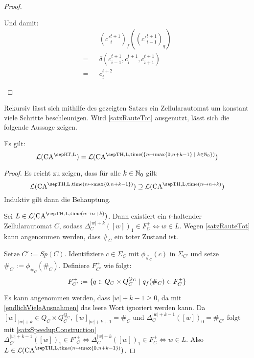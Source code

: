 \begin{proof}
\begin{enumerate}
            Und damit:
            \begin{align*}
                  && (c'^{t+1}_i)_f((c'^{t+1}_{i-1})_q) \\
                = && \delta(c^{t+1}_{i-1}, c^{t+1}_{i}, c^{t+1}_{i+1}) \\
                = && c^{t+2}_i
            \end{align*}
            
            
    \end{enumerate}
\end{proof}

Rekursiv lässt sich mithilfe des gezeigten Satzes ein Zellularautomat um konstant viele Schritte beschleunigen.
Wird \cref{satzRauteTot} ausgenutzt, lässt sich die folgende Aussage zeigen.

\begin{satz}
    \label{satzEchtzeitSpeedup}
    Es gilt:
    \[
        \CAL{\CART, \CALeft} =
            \CAL{\CAT, \CALeft, \mathrm{time}(\set{ n \mapsto \max \finset{0,  n + k - 1} }{ k \in \Nz })}
    \]
\end{satz}
\begin{proof}
    Es reicht zu zeigen, dass für alle $k \in \mathbb{N}_0$ gilt:
    \[
        \CAL{\CAT, \CALeft, \mathrm{time}(
                    n \mapsto \max \finset{0,  n + k - 1}
                )
            }
        \supseteq
        \CAL{\CAT, \CALeft, \mathrm{time}(
                    n \mapsto n + k
                )
            }
    \]
    Induktiv gilt dann die Behauptung.

    Sei $L \in \CAL{\CAT, \CALeft, \mathrm{time}(
                    n \mapsto n + k  )}$.
    Dann existiert ein $t$-haltender Zellularautomat $C$,
    sodass $\Delta_C^{|w|+k}([w])_1 \in F^+_C \Leftrightarrow w \in L$.
    Wegen \cref{satzRauteTot} kann angenommen werden, dass $\#_C$ ein toter Zustand ist.
    
    Setze $C' := Sp(C)$. Identifiziere $c \in \Sigma_C$ mit $\phi_{\#_C}(c)$ in $\Sigma_{C'}$ und setze $\#_{C'} := \phi_{\#_C}(\#_C)$.
    Definiere $F_{C'}^+$ wie folgt: \[
        F_{C'}^+ := \{ { q \in Q_C \times Q_C^{Q_C} } \; | \; { q_f({\#_C}) \in F_C^+ } \}
    \]
    
    Es kann angenommen werden, dass $|w| + k - 1 \geq 0$, da mit \cref{endlichVieleAusnahmen} das leere Wort ignoriert werden kann.
    Da $[w]_{|w|+k} \in Q_C \times Q_C^{Q_C}$, $[w]_{|w|+k+1} = \#_C$ und $\Delta^{|w|+k-1}_C([w])_0 = \#_C$, folgt mit \cref{satzSpeedupConstruction}
    $\Delta_{C'}^{|w|+k-1}([w])_1 \in F'^+_C
    \Leftrightarrow \Delta_C^{|w|+k}([w])_1 \in F^+_C
    \Leftrightarrow w \in L$.
    Also $L \in \CAL{\CAT, \CALeft, \mathrm{time}(
                    n \mapsto \max \finset{0,  n + k - 1}
                )}$.
\end{proof}


